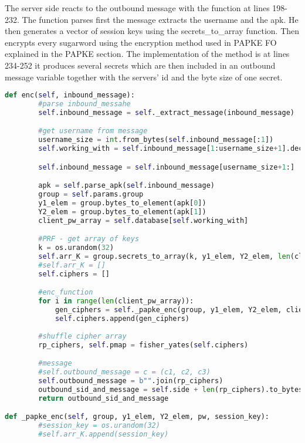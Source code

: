 \documentclass[../main.tex]{subfiles}
\begin{document}
The server side reacts to the outbound message with the function at lines 198-232. The
function parses first the message extracts the username and the apk. He then generates 
a vector of session keys using the secrets\_to\_array function. Then encrypts every
sugarword using the encryption method used in PAPKE FO \cite{bradley2019password} explained
in the PAPKE section. The implementation of the method is at lines 234-252 it produces several
secrets which are then included in an outbound message variable together with the servers' id and
the byte size of one secret.

\begin{lstlisting}[language=Python]
def enc(self, inbound_message):
        #parse inbound_messahe
        self.inbound_message = self._extract_message(inbound_message)

        #get username from message
        username_size = int.from_bytes(self.inbound_message[:1])
        self.working_with = self.inbound_message[1:username_size+1].decode('utf-8')

        self.inbound_message = self.inbound_message[username_size+1:]

        apk = self.parse_apk(self.inbound_message)
        group = self.params.group
        y1_elem = group.bytes_to_element(apk[0])
        Y2_elem = group.bytes_to_element(apk[1])
        client_pw_array = self.database[self.working_with]

        #PRF - get array of keys
        k = os.urandom(32)
        self.arr_K = group.secrets_to_array(k, y1_elem, Y2_elem, len(client_pw_array), 32)
        #self.arr_K = []
        self.ciphers = []

        #enc_function
        for i in range(len(client_pw_array)):
            gen_ciphers = self._papke_enc(group, y1_elem, Y2_elem, client_pw_array[i], self.arr_K[i])
            self.ciphers.append(gen_ciphers)
        
        #shuffle cipher array
        rp_ciphers, self.pmap = fisher_yates(self.ciphers)

        #message
        #self.outbound_message = c = (c1, c2, c3)
        self.outbound_message = b"".join(rp_ciphers)
        outbound_sid_and_message = self.side + len(rp_ciphers).to_bytes() + self.outbound_message
        return outbound_sid_and_message

def _papke_enc(self, group, y1_elem, Y2_elem, pw, session_key):
        #session_key = os.urandom(32)
        #self.arr_K.append(session_key)


\end{lstlisting}
\end{document}
